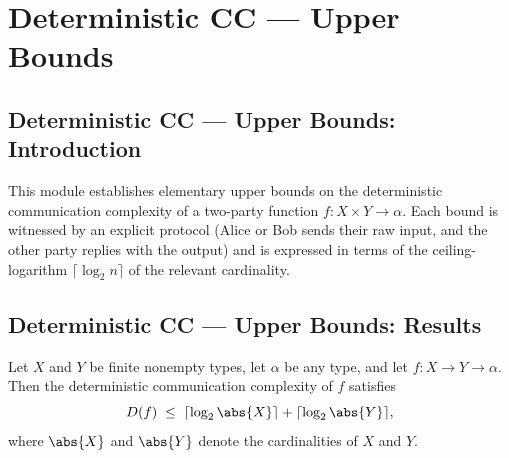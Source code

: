 \section{Deterministic CC --- Upper Bounds}
\subsection*{Deterministic CC --- Upper Bounds: Introduction}

This module establishes elementary upper bounds on the deterministic communication
complexity of a two-party function $f : X \times Y \to \alpha$.  Each bound is witnessed
by an explicit protocol (Alice or Bob sends their raw input, and the other party replies
with the output) and is expressed in terms of the ceiling-logarithm $\lceil \log_2 n \rceil$
of the relevant cardinality.

\subsection*{Deterministic CC --- Upper Bounds: Results}

\begin{theorem}
\label{CommunicationComplexity.Deterministic.communicationComplexity_le_clog_card}
\leanok
{}
Let $X$ and $Y$ be finite nonempty types, let $\alpha$ be any type, and let $f : X \to Y
\to \alpha$. Then the deterministic communication complexity of $f$ satisfies
\[
  D(f) \;\le\; \lceil \log_2 \abs{X} \rceil + \lceil \log_2 \abs{Y} \rceil,
\]
where $\abs{X}$ and $\abs{Y}$ denote the cardinalities of $X$ and $Y$.
\end{theorem}

